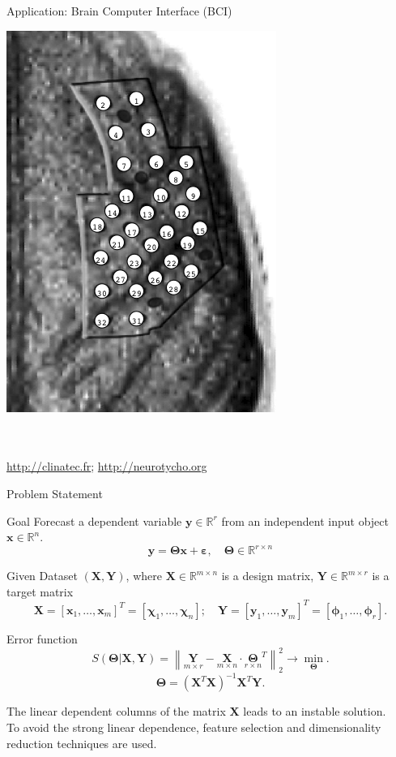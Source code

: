 \documentclass[9pt]{beamer}
\newcommand{\bx}{\mathbf{x}}
\newcommand{\by}{\mathbf{y}}
\newcommand{\bY}{\mathbf{Y}}
\newcommand{\bX}{\mathbf{X}}
\newcommand{\bbR}{\mathbb{R}}
\newcommand{\bchi}{\boldsymbol{\chi}}
\newcommand{\bphi}{\boldsymbol{\phi}}
\newcommand{\bTheta}{\boldsymbol{\Theta}}
\begin{document}
\begin{frame}{Application: Brain Computer Interface (BCI)}
\begin{minipage}{0.55\linewidth}
	\includegraphics[width=0.73\linewidth]{figs/electrodes}
\end{minipage}
\vspace{0.1cm} \\
\hrulefill \\
\url{http://clinatec.fr}; 
\url{http://neurotycho.org}
\end{frame}
\begin{frame}{Problem Statement}
	\begin{block}{Goal}
	Forecast a dependent variable $\by \in \bbR^r$ from an independent input object $\bx \in \bbR^n$.
	\[
	\by = \bTheta \bx+ \boldsymbol{\varepsilon}, \quad \bTheta \in \bbR^{r \times n}
	\]
	\vspace{-0.7cm}
	\end{block}
	\begin{block}{Given}
	Dataset $\left( \bX, \bY \right)$, where $\bX \in \bbR^{m \times n}$ is a design matrix, $\bY \in \bbR^{m \times r}$ is a target matrix
	\[
	\bX = [\bx_1, \dots, \bx_m]^{T} =  [\bchi_1, \dots, \bchi_n]; \quad \bY = [\by_1, \dots, \by_m]^{T} =  [\bphi_1, \dots, \bphi_r].
	\]
	\vspace{-0.7cm}
	\end{block}
	\begin{block}{Error function}
	\[
	S(\bTheta | \bX, \bY) = {\left\| \underset{m \times r}{\mathbf{Y}}  - \underset{m \times n}{\bX} \cdot \underset{r \times n}{\bTheta}^T \right\| }_2^2 \rightarrow\min_{\bTheta}.
	\label{eq:error_function}
	\]
	\[
	\bTheta = (\bX^{T} \bX)^{-1} \bX^{T} \bY.
	\]
	\end{block}
	The linear dependent columns of the matrix $\bX$ leads to an instable solution. \\
	To avoid the strong linear dependence, feature selection and dimensionality reduction techniques are used.
\end{frame}
\end{document}
